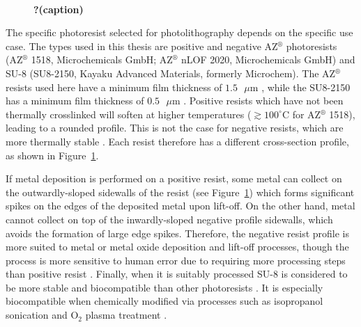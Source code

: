 \documentclass[
  a4paper,
]{scrbook}
\begin{document}
\begin{figure}
\begin{minipage}[t]{0.47\linewidth}
{}

\end{minipage}%
%
\begin{minipage}[t]{0.05\linewidth}

{\centering 

~

}

\end{minipage}%

\caption{\label{fig-photolithography-profiles}\textbf{?(caption)}}

\end{figure}

The specific photoresist selected for photolithography depends on the
specific use case. The types used in this thesis are positive and
negative AZ\(^\circledR\) photoresists (AZ\(^\circledR\) 1518,
Microchemicals GmbH; AZ\(^\circledR\) nLOF 2020, Microchemicals GmbH)
and SU-8 (SU8-2150, Kayaku Advanced Materials, formerly Microchem). The
AZ\(^\circledR\) resists used here have a minimum film thickness of
\(1.5\textrm{ } \mu \textrm{m}\) \autocite{Microchemicals}, while the
SU8-2150 has a minimum film thickness of
\(0.5\textrm{ } \mu \textrm{m}\) \autocite{Kayaku}. Positive resists
which have not been thermally crosslinked will soften at higher
temperatures (\(\gtrsim 100^\circ\)C for AZ\(^\circledR\) 1518), leading
to a rounded profile. This is not the case for negative resists, which
are more thermally stable \autocite{Microchemicals}. Each resist
therefore has a different cross-section profile, as shown in
Figure~\ref{fig-photolithography-profiles}.

If metal deposition is performed on a positive resist, some metal can
collect on the outwardly-sloped sidewalls of the resist (see
Figure~\ref{fig-photolithography-profiles}) which forms significant
spikes on the edges of the deposited metal upon lift-off. On the other
hand, metal cannot collect on top of the inwardly-sloped negative
profile sidewalls, which avoids the formation of large edge spikes.
Therefore, the negative resist profile is more suited to metal or metal
oxide deposition and lift-off processes, though the process is more
sensitive to human error due to requiring more processing steps than
positive resist \autocite{Microchemicals}. Finally, when it is suitably
processed SU-8 is considered to be more stable and biocompatible than
other photoresists \autocite{Albarghouthi2022}. It is especially
biocompatible when chemically modified via processes such as isopropanol
sonication and O\(_2\) plasma treatment \autocite{Chen2021}.
\end{document}
